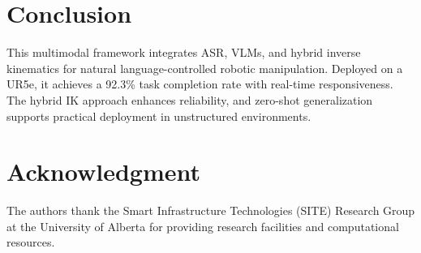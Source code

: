 \documentclass[conference]{IEEEtran}
\begin{document}
\section{Conclusion}
This multimodal framework integrates ASR, VLMs, and hybrid inverse kinematics for natural language-controlled robotic manipulation. Deployed on a UR5e, it achieves a 92.3\% task completion rate with real-time responsiveness. The hybrid IK approach enhances reliability, and zero-shot generalization supports practical deployment in unstructured environments.

\section*{Acknowledgment}
The authors thank the Smart Infrastructure Technologies (SITE) Research Group at the University of Alberta for providing research facilities and computational resources. 
\end{document}
